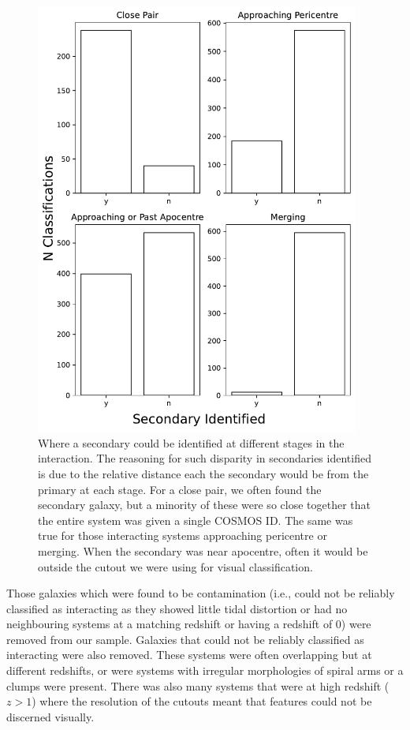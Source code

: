 \begin{figure}
\centering
\includegraphics[width=0.95\textwidth]{Chapter3/figures/visualisation_classification.pdf}
\caption[Where a secondary could be identified at different stages in the interaction.]{Where a secondary could be identified at different stages in the interaction. The reasoning for such disparity in secondaries identified is due to the relative distance each the secondary would be from the primary at each stage. For a close pair, we often found the secondary galaxy, but a minority of these were so close together that the entire system was given a single COSMOS ID. The same was true for those interacting systems approaching pericentre or merging. When the secondary was near apocentre, often it would be outside the cutout we were using for visual classification.}
\label{fig:secondaries_found}
\end{figure}

Those galaxies which were found to be contamination (i.e., could not be reliably classified as interacting as they showed little tidal distortion or had no neighbouring systems at a matching redshift or having a redshift of 0) were removed from our sample. Galaxies that could not be reliably classified as interacting were also removed. These systems were often overlapping but at different redshifts, or were systems with irregular morphologies of spiral arms or a clumps were present. There was also many systems that were at high redshift ($z > 1$) where the resolution of the cutouts meant that features could not be discerned visually.

